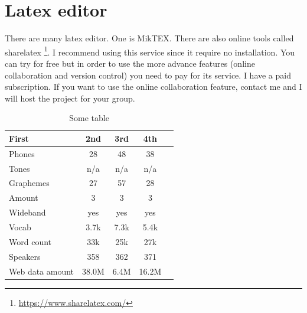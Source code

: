 \documentclass{article}
\begin{document}
\section{Latex editor}

There are many latex editor. One is MikTEX. There are also online tools called sharelatex \footnote{\url{https://www.sharelatex.com/}}. I recommend using this service since it require no installation. You can try for free but in order to use the more advance features (online collaboration and version control) you need to pay for its service. I have a paid subscription. If you want to use the online collaboration feature, contact me and I will host the project for your group.

\begin{table}
\centering
\begin{tabular}{|l|c|c|c|c|} %
 \hline %
First & 2nd & 3rd & 4th \\ %
 \hline
 Phones & 28 & 48 & 38 \\
 Tones & n/a & n/a & n/a \\
 Graphemes & 27 & 57 & 28 \\
 Amount & 3 & 3 & 3 \\
 Wideband & yes & yes & yes \\
 Vocab & 3.7k & 7.3k & 5.4k \\
 Word count & 33k & 25k & 27k \\
 Speakers & 358 & 362 & 371 \\
 Web data amount & 38.0M & 6.4M & 16.2M \\
 \hline
\end{tabular}
\caption{Some table}
\label{tab:table}
\end{table}



\end{document}
